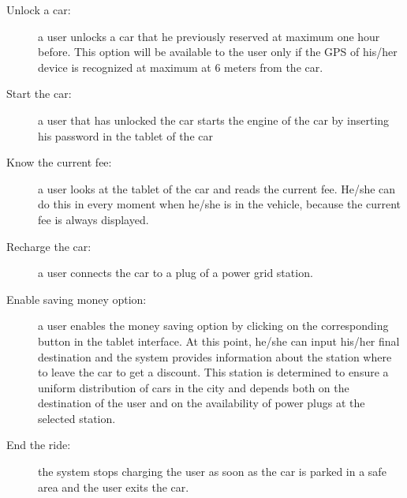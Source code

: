 \begin{description}
\item[Unlock a car:] a user unlocks a car that he previously reserved at maximum one hour before. This option will be available to the user only if the GPS of his/her device is recognized at maximum at 6 meters from the car.
\item[Start the car:] a user that has unlocked the car starts the engine of the car by inserting his password in the tablet of the car
\item[Know the current fee:] a user looks at the tablet of the car and reads the current fee. He/she can do this in every moment when he/she is in the vehicle, because the current fee is always displayed.
\item[Recharge the car:] a user connects the car to a plug of a power grid station.
\item[Enable saving money option:] a user enables the money saving option by clicking on the corresponding button in the tablet interface. At this point, he/she can input his/her final destination and the system provides information about the station where to leave the car to get a discount.
This station is determined to ensure a uniform distribution of cars in the city and depends both on the destination of the user and on the availability of power plugs at the selected station. 
\item[End the ride:] the system stops charging the user as soon as the car is parked in a safe area and the user exits the car.
\end{description}
